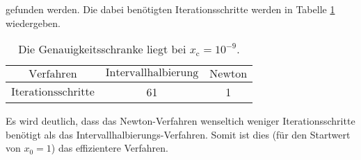 \noindent
gefunden werden. Die dabei benötigten Iterationsschritte werden in Tabelle
\ref{tab:A2} wiedergeben.

\begin{table}
\centering
\begin{tabular}{c c c}
  \toprule
  $\text{Verfahren}$          & $\text{Intervallhalbierung}$ & $\text{Newton}$  \\
  \midrule
  $\text{Iterationsschritte}$ & 61                           & 1                \\
  \bottomrule
\end{tabular}
\caption{Die Genauigkeitsschranke liegt bei $x_{\text{c}} = 10^{-9}$.}
\label{tab:A2}
\end{table}

\noindent
Es wird deutlich, dass das Newton-Verfahren wenseltich weniger Iterationsschritte
benötigt als das Intervallhalbierungs-Verfahren. Somit ist dies (für den Startwert von
$x_0 = 1$) das effizientere Verfahren.



